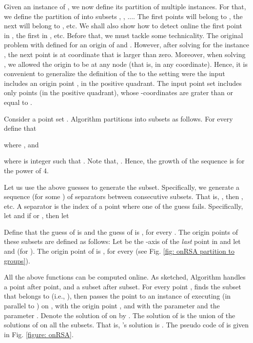 \documentclass[11pt]{article}
\begin{document}
Given an instance of , we now define its partition of multiple instances. For that, we define the partition of  into subsets , , .... The first  points will belong to , the next  will belong to , etc. We shall also show how to detect online the first point in , the first in , etc.
Before that, we must tackle some technicality. The original  problem with defined for an origin of  and .
However, after solving for the  instance , the next point is at  coordinate that is larger than zero.
Moreover, when solving , we allowed the origin to be at any node (that is, in any  coordinate).
Hence, it is convenient to generalize
the definition of the  to the setting were the input includes an origin point , in the positive quadrant. The input point set  includes only points (in the positive quadrant), whose -coordinates are grater than or equal to .




Consider a point set .
Algorithm  partitions  into subsets as follows.
For every  define that
\vspace{-0.0cm}

where , and
\vspace{-0.0cm}

where  is integer such that .
Note that, . Hence, the growth of the sequence  is for the power of 4.




Let us use the above guesses to generate the subset.
Specifically, we generate a sequence  (for some )
of separators between consecutive subsets.
That is, , then , etc.
A separator is the index of a point where one of the guess fails.
Specifically, let  and if  or , then let
\vspace{-0.0cm}

Define that the guess  of  is
 and the guess  of  is
, for every .
The origin points of these subsets are defined as follows:
Let
 be the -axis of the {\em last} point  in 
and let  and  (for ).
The origin point of  is , for every  (see Fig. \ref{fig: onRSA partition to groups}).



All the above functions can be computed online.
As
sketched,
Algorithm  handles a point after point, and a subset after subset.
For every point ,  finds the subset  that  belongs to (i.e., ), then 
passes the point to an instance of  executing (in parallel to ) on ,
with the origin point , and with the  parameter 
and the  parameter .
Denote the solution
of 
on  by .
The solution of  is the union of the solutions of  on all the subsets. That is,
's solution is .
The pseudo code of  is given in Fig. \ref{figure: onRSA}.
\end{document}
